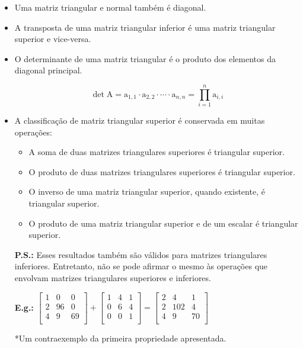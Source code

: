 \documentclass[a4paper,12pt]{article}
\begin{document}
\begin{itemize}

\item Uma matriz triangular e normal também é diagonal.

\item A transposta de uma matriz triangular inferior é uma matriz triangular superior e vice-versa.

\item O determinante de uma matriz triangular é o produto dos elementos da diagonal principal.

$$ \det \text{A}=\text{a}_{1,1} \cdot \text{a}_{2,2} \cdot \cdots \cdot \text{a}_{n,n}=\prod _{i=1}^{n}\text{a}_{i,i} $$

\item A classificação de matriz triangular superior é conservada em muitas operações:

  \begin{itemize}
  
    \item A soma de duas matrizes triangulares superiores é triangular superior.
  
    \item O produto de duas matrizes triangulares superiores é triangular superior.
  
    \item O inverso de uma matriz triangular superior, quando existente, é triangular superior.
  
    \item O produto de uma matriz triangular superior e de um escalar é triangular superior.
  
  \end{itemize}
  
  \textbf{P.S.:} Esses resultados também são válidos para matrizes triangulares inferiores. Entretanto, não se pode afirmar o mesmo às operações que envolvam matrizes triangulares superiores e inferiores.
  
  \textbf{E.g.:}
  $\begin{bmatrix}
  1 & 0 & 0 \\
  2 & 96 & 0 \\
  4 & 9 & 69 \\
\end{bmatrix} + \begin{bmatrix}
  1 & 4 & 1 \\
  0 & 6 & 4 \\
  0 & 0 & 1 \\
\end{bmatrix} = \begin{bmatrix}
 2  & 4 & 1 \\
 2  & 102 & 4 \\
 4 & 9 & 70 \\
\end{bmatrix} $
  
  *Um contraexemplo da primeira propriedade apresentada.

\end{itemize}
\end{document}
